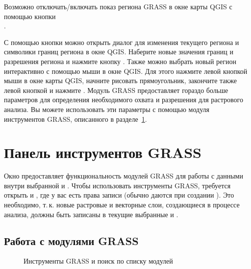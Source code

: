 Возможно отключать/включать показ региона GRASS в окне карты QGIS с
помощью кнопки \\
.

С помощью кнопки 
можно открыть диалог для изменения текущего региона и символики границ
региона в окне QGIS. Наберите новые значения границ и разрешения региона
и нажмите кнопку . Также можно выбрать новый регион
интерактивно с помощью мыши в окне QGIS. Для этого нажмите левой кнопкой
мыши в окне карты QGIS, начните рисовать прямоугольник, закончите также
левой кнопкой и нажмите .
Модуль GRASS  предоставляет гораздо больше
параметров для определения необходимого охвата и разрешения для
растрового анализа. Вы можете использовать эти параметры с помощью
модуля инструментов GRASS, описанного в разделе~\ref{subsec:grass_toolbox}.

\section{Панель инструментов GRASS}\label{subsec:grass_toolbox}

Окно  предоставляет
функциональность модулей GRASS для работы с данными внутри выбранной
 и . Чтобы использовать инструменты
GRASS, требуется открыть  и , где у
вас есть права записи (обычно даются при создании ).
Это необходимо, т.\,к. новые растровые и векторные слои, создающиеся в
процессе анализа, должны быть записаны в текущие выбранные
 и .

\subsection{Работа с модулями GRASS}\label{grass_modules}

\begin{figure}[ht]
\centering
   \hspace{0.5cm}
\caption{Инструменты GRASS и поиск по списку модулей \wincaption}\label{fig:grass_modules}
\end{figure}

